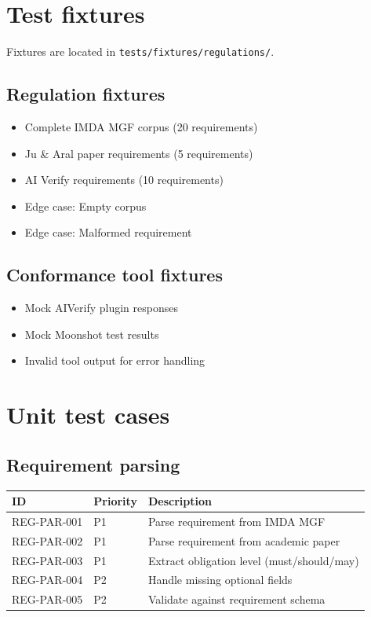 \documentclass[11pt,a4paper,twoside]{report}
\begin{document}
\section{Test fixtures}

Fixtures are located in \texttt{tests/fixtures/regulations/}.

\subsection{Regulation fixtures}

\begin{itemize}
\item Complete IMDA MGF corpus (20 requirements)
\item Ju \& Aral paper requirements (5 requirements)
\item AI Verify requirements (10 requirements)
\item Edge case: Empty corpus
\item Edge case: Malformed requirement
\end{itemize}

\subsection{Conformance tool fixtures}

\begin{itemize}
\item Mock AIVerify plugin responses
\item Mock Moonshot test results
\item Invalid tool output for error handling
\end{itemize}

\section{Unit test cases}

\subsection{Requirement parsing}

\begin{tabularx}{\linewidth}{@{}l l X@{}}
\toprule
\textbf{ID} & \textbf{Priority} & \textbf{Description} \\ \midrule
REG-PAR-001 & P1 & Parse requirement from IMDA MGF \\
REG-PAR-002 & P1 & Parse requirement from academic paper \\
REG-PAR-003 & P1 & Extract obligation level (must/should/may) \\
REG-PAR-004 & P2 & Handle missing optional fields \\
REG-PAR-005 & P2 & Validate against requirement schema \\
\bottomrule
\end{tabularx}
\end{document}

